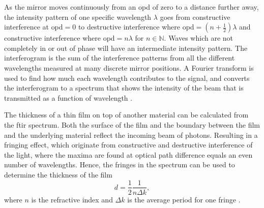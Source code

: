 As the mirror moves continuously from an \ac{opd} of zero to a distance further away, the intensity pattern of one specific wavelength $\lambda$ goes from constructive interference at \ac{opd}$=0$ to destructive interference where \ac{opd}$=(n+\frac{1}{2}) \lambda$ and constructive interference where \ac{opd}$= n \lambda$ for $n\in\mathbb{N}$. Waves which are not completely in or out of phase will have an intermediate intensity pattern. The interferogram is the sum of the interference patterns from all the different wavelengths measured at many discrete mirror positions. A Fourier transform is used to find how much each wavelength contributes to the signal, and converts the interferogram to a spectrum that shows the intensity of the beam that is transmitted as a function of wavelength \citep{smith2011fourier}.

%
%
%
The thickness of a thin film on top of another material can be calculated from the \ac{ftir} spectrum. Both the surface of the film and the boundary between the film and the underlying material reflect the incoming beam of photons. Resulting in a fringing effect, which originate from constructive and destructive interference of the light, where the maxima are found at optical path difference equals an even number of wavelengths. Hence, the fringes in the spectrum can be used to determine the thickness of the film
\begin{equation}
\label{eq:ftir_thickness}
d = \frac{1}{2}\frac{1}{n\Delta k},
\end{equation}
where $n$ is the refractive index and $\Delta k$ is the average period for one fringe \citep{griffiths2007fourier, stuart2008modern}.
%
